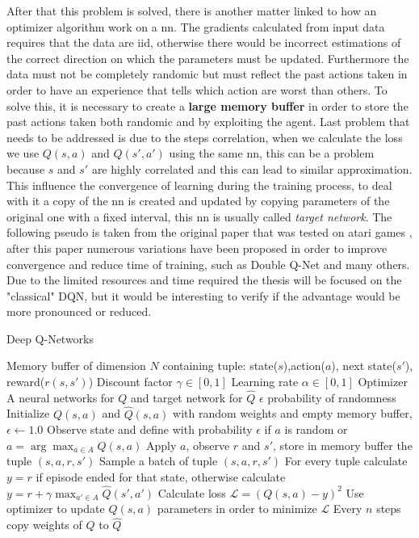 After that this problem is solved, there is another matter linked to how an optimizer algorithm work on a \acrshort{nn}. The gradients calculated from input data requires that the data are \acrshort{iid}, otherwise there would be incorrect estimations of the correct direction on which the parameters must be updated. Furthermore the data must not be completely randomic but must reflect the past actions taken in order to have an experience that tells which action are worst than others. To solve this, it is necessary to create a \textbf{large memory buffer} in order to store the past actions taken both randomic and by exploiting the agent.
Last problem that needs to be addressed is due to the steps correlation, when we calculate the loss we use $Q(s,a)$ and $Q(s',a')$ using the same \acrshort{nn}, this can be a problem because $s$ and $s'$ are highly correlated and this can lead to similar approximation. This influence the convergence of learning during the training process, to deal with it a copy of the \acrshort{nn} is created and updated by copying parameters of the original one with a fixed interval, this \acrshort{nn} is usually called \textit{target network}.
The following pseudo is taken from the original paper that was tested on atari games \cite{DBLP:journals/corr/MnihKSGAWR13}, after this paper numerous variations have been proposed in order to improve convergence and reduce time of training, such as Double Q-Net \cite{DBLP:journals/corr/HasseltGS15} and many others. Due to the limited resources and time required the thesis will be focused on the "classical" DQN, but it would be interesting to verify if the advantage would be more pronounced or reduced.
\begin{algorithm} \label{DQN}
	\caption{Deep Q-Networks}
	\begin{algorithmic}
	\REQUIRE Memory buffer of dimension $N$ containing tuple: state($s$),action($a$), next state($s'$), reward($r(s,s')$)
	\REQUIRE Discount factor $\gamma \in [0,1]$
	\REQUIRE Learning rate  $\alpha \in  [0,1]$
	\REQUIRE Optimizer
	\REQUIRE A neural networks for $Q$ and target network for $\hat{Q}$
	\REQUIRE $\epsilon$ probability of randomness
	\STATE Initialize $Q(s,a)$ and $\hat{Q}(s,a)$ with random weights and empty memory buffer, $\epsilon \leftarrow 1.0$
	\STATE Observe state and define with probability $\epsilon$ if $a$ is random or $a = \arg \max_{a \in A} Q(s,a)$
	\STATE Apply $a$, observe $r$ and $s'$, store in memory buffer the tuple $(s,a,r,s')$
	\STATE Sample a batch of tuple $(s,a,r,s')$
	\STATE For every tuple calculate $y = r$ if episode ended for that state, otherwise calculate $y = r + \gamma \max_{a' \in A} \hat{Q}(s',a')$
	\STATE Calculate loss $\mathcal{L} = (Q(s,a) - y)^2$
	\STATE Use optimizer to update $Q(s,a)$ parameters in order to minimize $\mathcal{L}$ 
	\STATE Every $n$ steps copy weights of $Q$ to $\hat{Q}$
	\ENDWHILE		
	\end{algorithmic}
\end{algorithm}

